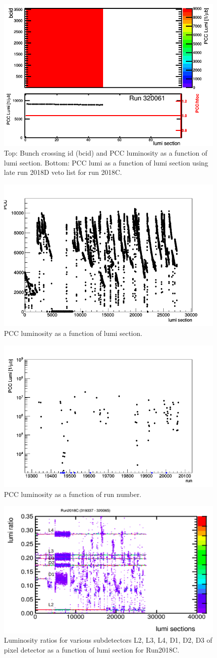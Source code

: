 \begin{figure}[H]
  \centering
  \includegraphics[width=0.5\columnwidth]{./320061.png}
  \caption{Top: Bunch crossing id (bcid) and PCC luminosity as a function of lumi section. Bottom: PCC lumi as a function of lumi section using late run 2018D veto list for run 2018C.}
  \label{fig:CMS}
\end{figure}


\begin{figure}[H]
  \centering
  \includegraphics[width=0.5\columnwidth]{./ls_lumi_2018C.png}
  \caption{PCC luminosity as a function of lumi section.}
  \label{fig:CMS}
\end{figure}


\begin{figure}[H]
  \centering
  \includegraphics[width=0.5\columnwidth]{./runs_2018C.png}
  \caption{PCC luminosity as a function of run number.}
  \label{fig:CMS}
\end{figure}


\begin{figure}[H]
  \centering
  \includegraphics[width=0.5\columnwidth]{./2018C_lumiratio.png}
  \caption{Luminosity ratios for various subdetectors L2, L3, L4, D1, D2, D3 of pixel detector as a function of lumi section for Run2018C. }
  \label{fig:CMS}
\end{figure}


